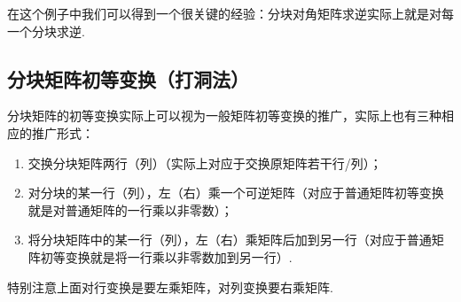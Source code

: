 在这个例子中我们可以得到一个很关键的经验：分块对角矩阵求逆实际上就是对每一个分块求逆.

\subsection{分块矩阵初等变换（打洞法）}

分块矩阵的初等变换实际上可以视为一般矩阵初等变换的推广，实际上也有三种相应的推广形式：
\begin{enumerate}
    \item 交换分块矩阵两行（列）（实际上对应于交换原矩阵若干行/列）；

    \item 对分块的某一行（列），左（右）乘一个可逆矩阵（对应于普通矩阵初等变换就是对普通矩阵的一行乘以非零数）；

    \item 将分块矩阵中的某一行（列），左（右）乘矩阵后加到另一行（对应于普通矩阵初等变换就是将一行乘以非零数加到另一行）.
\end{enumerate}
特别注意上面对行变换是要左乘矩阵，对列变换要右乘矩阵.

